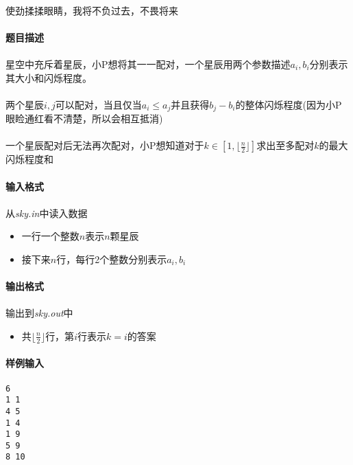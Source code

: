 \documentclass[UTF8]{ctexart}
\begin{document}
\paragraph{}使劲揉揉眼睛，我将不负过去，不畏将来
\paragraph{题目描述}
\paragraph{}星空中充斥着星辰，小P想将其一一配对，一个星辰用两个参数描述$a_i,b_i$分别表示其大小和闪烁程度。
\paragraph{}两个星辰$i,j$可以配对，当且仅当$a_i\leq a_j$并且获得$b_j-b_i$的整体闪烁程度(因为小P眼睑通红看不清楚，所以会相互抵消)
\paragraph{}一个星辰配对后无法再次配对，小P想知道对于$k\in[1,\lfloor \frac{n}{2}\rfloor]$求出至多配对$k$的最大闪烁程度和
\paragraph{输入格式}
\paragraph{}从\emph{sky.in}中读入数据
\begin{itemize}
	\item 一行一个整数$n$表示$n$颗星辰
	\item 接下来$n$行，每行2个整数分别表示$a_i,b_i$
\end{itemize}
\paragraph{输出格式}
\paragraph{}输出到\emph{sky.out}中
\begin{itemize}
	\item 共$\lfloor\frac{n}{2}\rfloor$行，第$i$行表示$k=i$的答案
\end{itemize}
\clearpage
\paragraph{样例输入}
\begin{lstlisting}
6
1 1
4 5
1 4
1 9
5 9
8 10
\end{lstlisting}
\end{document}
